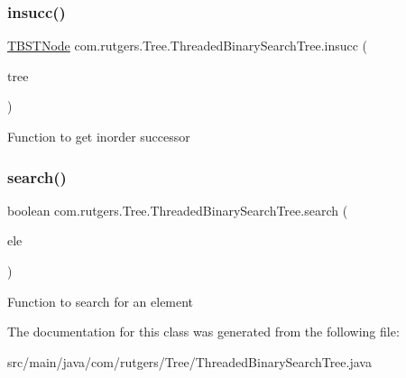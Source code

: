 \subsubsection{\texorpdfstring{insucc()}{insucc()}}
{\footnotesize\ttfamily \hyperlink{classcom_1_1rutgers_1_1Tree_1_1TBSTNode}{T\+B\+S\+T\+Node} com.\+rutgers.\+Tree.\+Threaded\+Binary\+Search\+Tree.\+insucc (\begin{DoxyParamCaption}\item[{\hyperlink{classcom_1_1rutgers_1_1Tree_1_1TBSTNode}{T\+B\+S\+T\+Node}}]{tree }\end{DoxyParamCaption})}

Function to get inorder successor \mbox{\label{classcom_1_1rutgers_1_1Tree_1_1ThreadedBinarySearchTree_abe8456f4ad7777a85ecc95c2f9ad1fb6}} 
\subsubsection{\texorpdfstring{search()}{search()}}
{\footnotesize\ttfamily boolean com.\+rutgers.\+Tree.\+Threaded\+Binary\+Search\+Tree.\+search (\begin{DoxyParamCaption}\item[{Number640}]{ele }\end{DoxyParamCaption})}

Function to search for an element 

The documentation for this class was generated from the following file\+:\begin{DoxyCompactItemize}
\item 
src/main/java/com/rutgers/\+Tree/Threaded\+Binary\+Search\+Tree.\+java\end{DoxyCompactItemize}
